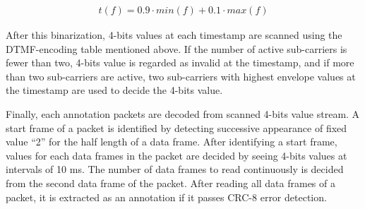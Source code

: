\begin{align}
t(f) = 0.9 \cdot min(f) + 0.1 \cdot max(f)
\end{align}

After this binarization, 4-bits values at each timestamp are scanned using the DTMF-encoding table mentioned above.
If the number of active sub-carriers is fewer than two, 4-bits value is regarded as invalid  at the timestamp, and if more than two sub-carriers are active, two sub-carriers with highest envelope values at the timestamp are used to decide the 4-bits value.

Finally, each annotation packets are decoded from scanned 4-bits value stream.
A start frame of a packet is identified by detecting successive appearance of fixed value ``2'' for the half length of a data frame.
After identifying a start frame, values for each data frames in the packet are decided by seeing 4-bits values at intervals of 10 ms.
The number of data frames to read continuously is decided from the second data frame of the packet.
After reading all data frames of a packet, it is extracted as an annotation if it passes CRC-8 error detection.